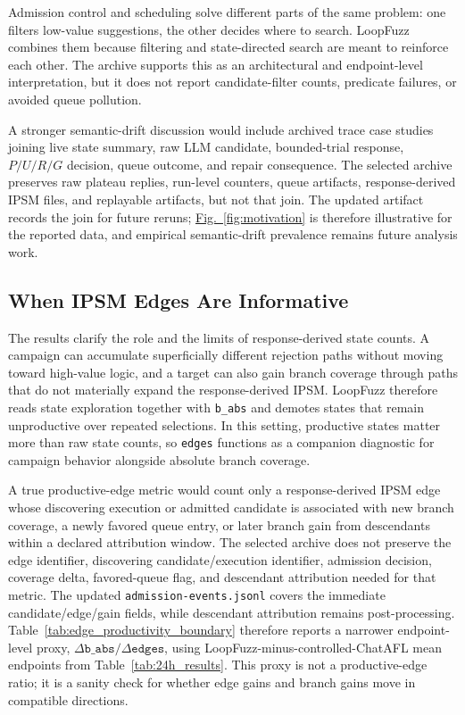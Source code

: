 \documentclass[final,5p,times,number]{elsarticle}
\newcommand{\figref}[1]{\hyperref[#1]{Fig.~\ref*{#1}}}
\begin{document}
Admission control and scheduling solve different parts of the same problem: one filters low-value suggestions, the other decides where to search. LoopFuzz combines them because filtering and state-directed search are meant to reinforce each other. The archive supports this as an architectural and endpoint-level interpretation, but it does not report candidate-filter counts, predicate failures, or avoided queue pollution.

A stronger semantic-drift discussion would include archived trace case studies joining live state summary, raw LLM candidate, bounded-trial response, $P/U/R/G$ decision, queue outcome, and repair consequence. The selected archive preserves raw plateau replies, run-level counters, queue artifacts, response-derived IPSM files, and replayable artifacts, but not that join. The updated artifact records the join for future reruns; \figref{fig:motivation} is therefore illustrative for the reported data, and empirical semantic-drift prevalence remains future analysis work.

\subsection{When IPSM Edges Are Informative}
\label{sec:ipsm_edges_informative}

The results clarify the role and the limits of response-derived state counts. A campaign can accumulate superficially different rejection paths without moving toward high-value logic, and a target can also gain branch coverage through paths that do not materially expand the response-derived IPSM. LoopFuzz therefore reads state exploration together with \texttt{b\_abs} and demotes states that remain unproductive over repeated selections. In this setting, productive states matter more than raw state counts, so \texttt{edges} functions as a companion diagnostic for campaign behavior alongside absolute branch coverage.

A true productive-edge metric would count only a response-derived IPSM edge whose discovering execution or admitted candidate is associated with new branch coverage, a newly favored queue entry, or later branch gain from descendants within a declared attribution window. The selected archive does not preserve the edge identifier, discovering candidate/execution identifier, admission decision, coverage delta, favored-queue flag, and descendant attribution needed for that metric. The updated \texttt{admission-events.jsonl} covers the immediate candidate/edge/gain fields, while descendant attribution remains post-processing. Table~\ref{tab:edge_productivity_boundary} therefore reports a narrower endpoint-level proxy, $\Delta\texttt{b\_abs}/\Delta\texttt{edges}$, using LoopFuzz-minus-controlled-ChatAFL mean endpoints from Table~\ref{tab:24h_results}. This proxy is not a productive-edge ratio; it is a sanity check for whether edge gains and branch gains move in compatible directions.
\end{document}
